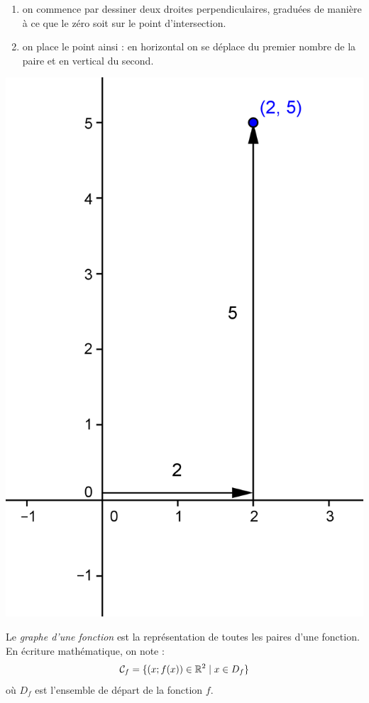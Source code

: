 \begin{exemple}
\begin{enumerate}
\item on commence par dessiner deux droites perpendiculaires, graduées de manière à ce que le zéro soit sur le point d'intersection.
\item on place le point ainsi : en horizontal on se déplace du premier nombre de la paire et en vertical du second.
\end{enumerate}
\begin{center}
\includegraphics{affines/fct_intro.png}
\end{center}
\end{exemple}

\begin{definition}
Le \emph{graphe d'une fonction} est la représentation de toutes les paires d'une fonction. En écriture mathématique, on note :
$$
\mathcal{C}_f = \{(x;f(x))\in \mathbb{R}^2 \; | \; x\in D_f\}
$$
où $D_f$ est l'ensemble de départ de la fonction $f$.
\end{definition}

